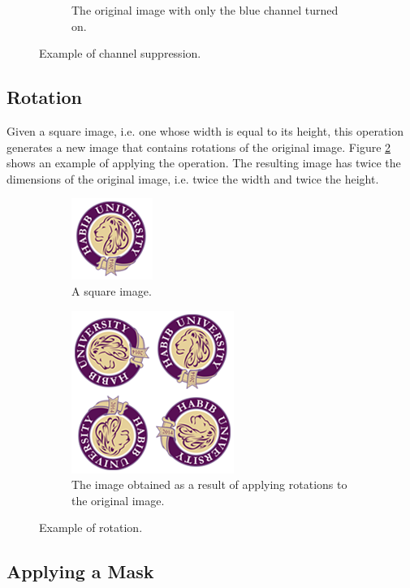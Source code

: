 \documentclass[addpoints]{exam}
\begin{document}
\begin{figure}
\begin{subfigure}{.3\textwidth}
    \caption{The original image with only the blue channel turned on.}
  \end{subfigure}
  \caption{Example of channel suppression.}
  \label{fig:channel}
\end{figure}

\subsection{Rotation}

Given a square image, i.e. one whose width is equal to its height, this operation generates a new image that contains rotations of the original image. Figure \ref{fig:rotate} shows an example of applying the operation. The resulting image has twice the dimensions of the original image, i.e. twice the width and twice the height.

\begin{figure}
  \centering
  \begin{subfigure}{.2\textwidth}
    \includegraphics[scale=.5]{hu-logo}
    \caption{A square image.}
  \end{subfigure}
  \begin{subfigure}[c]{.35\textwidth}
    \includegraphics[scale=.5]{hu-logo-rotated}
    \caption{The image obtained as a result of applying rotations to the original image.}
  \end{subfigure}
  \caption{Example of rotation.}
  \label{fig:rotate}
\end{figure}

\subsection{Applying a Mask}
\end{document}
